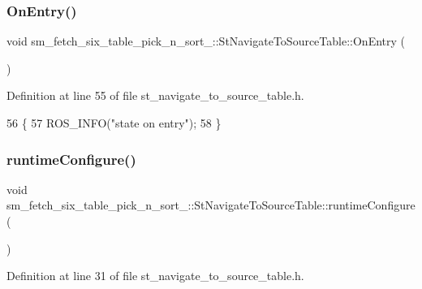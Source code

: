 \subsubsection{\texorpdfstring{On\+Entry()}{OnEntry()}}
{\footnotesize\ttfamily void sm\+\_\+fetch\+\_\+six\+\_\+table\+\_\+pick\+\_\+n\+\_\+sort\+\_\+::\+St\+Navigate\+To\+Source\+Table\+::\+On\+Entry (\begin{DoxyParamCaption}{ }\end{DoxyParamCaption})\hspace{0.3cm}{\ttfamily [inline]}}



Definition at line 55 of file st\+\_\+navigate\+\_\+to\+\_\+source\+\_\+table.\+h.


\begin{DoxyCode}
56         \{
57             ROS\_INFO(\textcolor{stringliteral}{"state on entry"});
58         \}
\end{DoxyCode}
\mbox{\label{structsm__fetch__six__table__pick__n__sort__1_1_1StNavigateToSourceTable_a1e4b8cd70fbb88d5c42ebfdc48a9122f}} 
\subsubsection{\texorpdfstring{runtime\+Configure()}{runtimeConfigure()}}
{\footnotesize\ttfamily void sm\+\_\+fetch\+\_\+six\+\_\+table\+\_\+pick\+\_\+n\+\_\+sort\+\_\+::\+St\+Navigate\+To\+Source\+Table\+::runtime\+Configure (\begin{DoxyParamCaption}{ }\end{DoxyParamCaption})\hspace{0.3cm}{\ttfamily [inline]}}



Definition at line 31 of file st\+\_\+navigate\+\_\+to\+\_\+source\+\_\+table.\+h.



